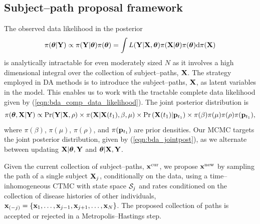 \subsection{Subject--path proposal framework}
\label{subsec:bda_subj_proc}
The observed data likelihood in the posterior  $$ \pi(\boldsymbol{\theta}|\mathbf{Y}) \propto \pi(\mathbf{Y}|\boldsymbol{\theta})\pi(\boldsymbol{\theta})=\int L(\mathbf{Y}|\mathbf{X}, \boldsymbol{\theta}) \pi(\mathbf{X}|\boldsymbol{\theta}) \pi(\boldsymbol{\theta}) \mathrm{d}\pi(\mathbf{X})$$
is analytically intractable for even moderately sized $ N $ as it involves a  high dimensional integral over the collection of subject--paths, $ \mathbf{X} $. The strategy employed in DA methods is to introduce the subject--paths, $ \mathbf{X} $, as latent variables in the model. This enables us to work with the tractable complete data likelihood given by (\ref{eqn:bda_comp_data_likelihood}). The joint posterior distribution is \begin{equation}
\label{eqn:bda_jointpost}
\pi(\boldsymbol{\theta}, \mathbf{X}| \mathbf{Y}) \propto \Pr(\mathbf{Y}|\mathbf{X},\rho) \times\pi(\mathbf{X}|\mathbf{X}(t_1),\beta,\mu) \times \Pr\left (\mathbf{X}(t_1)|\mathbf{p}_{t_1}\right) \times\pi(\beta)\pi(\mu) \pi(\rho) \pi(\mathbf{p}_{t_1}),
\end{equation} where $ \pi(\beta)$, $\pi(\mu)$, $\pi(\rho)$, and $\pi(\mathbf{p}_{t_1}) $ are prior densities. Our MCMC targets the joint posterior distribution, given by (\ref{eqn:bda_jointpost}), as we alternate between updating $ \mathbf{X}|\boldsymbol{\theta},\mathbf{Y} $ and $ \boldsymbol{\theta}|\mathbf{X},\mathbf{Y} $. 

Given the current collection of subject--paths, $ \mathbf{x}^{\mathrm{cur}} $, we propose $ \mathbf{x}^{\mathrm{new}} $ by sampling the path of a single subject $\mathbf{X}_j$, conditionally on the data, using a time--inhomogeneous CTMC with state space $ \mathcal{S}_j  $ and rates conditioned on the collection of disease histories of other individuals, $ \mathbf{x}_{(-j)}  = \lbrace \mathbf{x}_1,\dots,\mathbf{x}_{j-1},\mathbf{x}_{j+1},\dots,\mathbf{x}_N \rbrace$. The proposed collection of paths is accepted or rejected in a Metropolis--Hastings step. 

